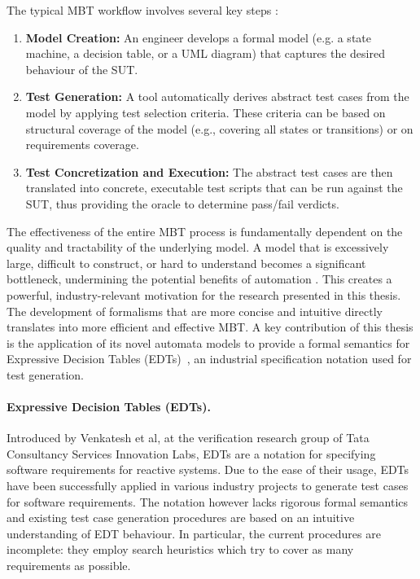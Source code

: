 The typical MBT workflow involves several key steps \cite{rg_survey_mbt_tools}:
\begin{enumerate}
    \item \textbf{Model Creation:} An engineer develops a formal model (e.g. a state machine, a decision table, or a UML diagram) that captures the desired behaviour of the SUT.
    \item \textbf{Test Generation:} A tool automatically derives abstract test cases from the model by applying test selection criteria. These criteria can be based on structural coverage of the model (e.g., covering all states or transitions) or on requirements coverage.
    \item \textbf{Test Concretization and Execution:} The abstract test cases are then translated into concrete, executable test scripts that can be run against the SUT, thus providing the oracle to determine pass/fail verdicts.
\end{enumerate}

The effectiveness of the entire MBT process is fundamentally dependent on the quality and tractability of the underlying model. A model that is excessively large, difficult to construct, or hard to understand becomes a significant bottleneck, undermining the potential benefits of automation \cite{10.1145/1353673.1353681}. This creates a powerful, industry-relevant motivation for the research presented in this thesis. The development of formalisms that are more concise and intuitive directly translates into more efficient and effective MBT. A key contribution of this thesis is the application of its novel automata models to provide a formal semantics for Expressive Decision Tables (EDTs)~\cite{DBLP:conf/date/VenkateshSKA14}, an industrial specification notation used for test generation.

\paragraph*{Expressive Decision Tables (EDTs).} Introduced by
Venkatesh et al, at the verification research group of Tata Consultancy Services Innovation Labs, EDTs are a notation for specifying software requirements for reactive systems. Due to the ease of their usage,
EDTs have been successfully applied in various industry projects
to generate test cases for software requirements. The notation
however lacks rigorous formal semantics and existing test case
generation procedures are based on an intuitive understanding
of EDT behaviour. In particular, the current procedures are
incomplete: they employ search heuristics which try to cover
as many requirements as possible.

